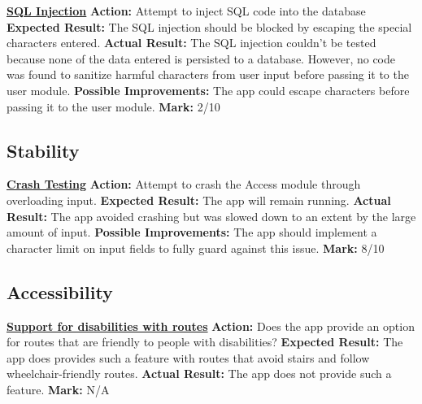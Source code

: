 \documentclass[english]{article}
\begin{document}
            \textbf{\underline{SQL Injection}}\newline
		    \textbf{Action:} Attempt to inject SQL code into the database\newline
            \textbf{Expected Result:} The SQL injection should be blocked by escaping the special characters entered.\newline
            \textbf{Actual Result:} The SQL injection couldn't be tested because none of the data entered is persisted to a database. However, no code was found to sanitize harmful characters from user input before passing it to the user module. \newline
            \textbf{Possible Improvements:} The app could escape characters before passing it to the user module. \newline
            \textbf{Mark:} 2/10\newline

        \subsection{Stability}\label{subsec:overall-stability}
		    \textbf{\underline{Crash Testing}}\newline
		    \textbf{Action:} Attempt to crash the Access module through overloading input.\newline
            \textbf{Expected Result:} The app will remain running.\newline
            \textbf{Actual Result:} The app avoided crashing but was slowed down to an extent by the large amount of input.\newline
            \textbf{Possible Improvements:} The app should implement a character limit on input fields to fully guard against this issue.\newline
            \textbf{Mark:} 8/10\newline
            
        \subsection{Accessibility}\label{subsec:overall-accessibility}
		    \textbf{\underline{Support for disabilities with routes}}\newline
		    \textbf{Action:} Does the app provide an option for routes that are friendly to people with disabilities?\newline
            \textbf{Expected Result:} The app does provides such a feature with routes that avoid stairs and follow wheelchair-friendly routes.\newline
            \textbf{Actual Result:} The app does not provide such a feature.\newline
            \textbf{Mark:} N/A\newline
            
\end{document}
